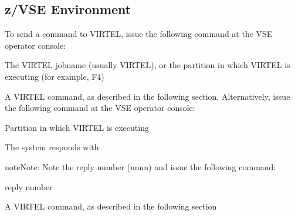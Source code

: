 \documentclass[letterpaper,10pt,english]{sphinxmanual}
\begin{document}
\subsection{z/VSE Environment}
\label{\detokenize{audit_operations_ and_performance:z-vse-environment}}\label{\detokenize{audit_operations_ and_performance:index-2}}
\sphinxAtStartPar
To send a command to VIRTEL, issue the following command at the VSE operator console:

\begin{sphinxVerbatim}[commandchars=\\\{\}]
 
\end{sphinxVerbatim}
\begin{description}
\sphinxAtStartPar
The VIRTEL jobname (usually VIRTEL), or the partition in which VIRTEL is executing (for example, F4)

\sphinxAtStartPar
A VIRTEL command, as described in the following section. Alternatively, issue the following command at the VSE operator console:

\end{description}

\begin{sphinxVerbatim}[commandchars=\\\{\}]
 
\end{sphinxVerbatim}
\begin{description}
\sphinxAtStartPar
Partition in which VIRTEL is executing

\sphinxAtStartPar
The system responds with:

\end{description}

\begin{sphinxVerbatim}[commandchars=\\\{\}]
   
 
\end{sphinxVerbatim}

\begin{sphinxadmonition}{note}{Note:}
\sphinxAtStartPar
Note the reply number (nnnn) and issue the following command:
\end{sphinxadmonition}

\begin{sphinxVerbatim}[commandchars=\\\{\}]
 
\end{sphinxVerbatim}
\begin{description}
\sphinxAtStartPar
reply number

\sphinxAtStartPar
A VIRTEL command, as described in the following section

\end{description}
\end{document}
